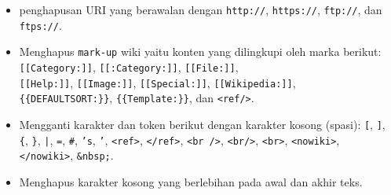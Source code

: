 \begin{itemize}
\item penghapusan URI yang berawalan dengan
\texttt{http://}, \texttt{https://}, \texttt{ftp://}, dan \texttt{ftps://}.
\item Menghapus \texttt{mark-up} wiki yaitu konten yang dilingkupi oleh marka
berikut:
\texttt{[[Category:]]}, \texttt{[[:Category:]]}, \texttt{[[File:]]}, \\
\texttt{[[Help:]]}, \texttt{[[Image:]]}, \texttt{[[Special:]]},
\texttt{[[Wikipedia:]]}, \\
\texttt{\{\{DEFAULTSORT:\}\}}, \texttt{\{\{Template:\}\}}, dan \texttt{<ref/>}.

\item Mengganti karakter dan token berikut dengan karakter kosong (spasi):
\texttt{[}, \texttt{]}, \texttt{\{}, \texttt{\}}, \texttt{|}, \texttt{=},
\texttt{\#}, \texttt{'s}, \texttt{'}, \texttt{<ref>}, \texttt{</ref>},
\texttt{<br />}, \texttt{<br/>}, \texttt{<br>}, \texttt{<nowiki>},
\texttt{</nowiki>}, \texttt{\&nbsp;}.

\item Menghapus karakter kosong yang berlebihan pada awal dan akhir teks.
\end{itemize}
